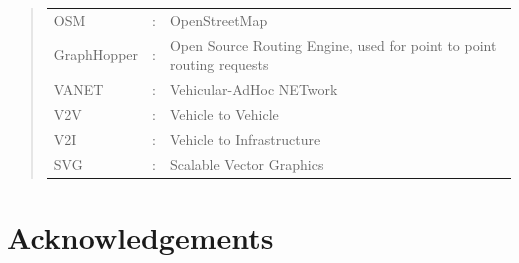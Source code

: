\documentclass[ %
                    author={Alexander Hill},
                supervisor={Dr. Benjamin Sach},
                    degree={MEng},
                     title={MARMOSET},
                  subtitle={Multi-Agent Route Management using Online Simulation for Efficient Transportation},
                      type={research},
                      year={2016} ]{dissertation}
\begin{document}

\begin{quote}
\noindent
\begin{tabular}{lcl}
OSM                 &:     & OpenStreetMap \\
GraphHopper         &:     & Open Source Routing Engine, used for point to point routing requests \\
VANET               &:     & Vehicular-AdHoc NETwork \\
V2V                 &:     & Vehicle to Vehicle \\
V2I                 &:     & Vehicle to Infrastructure \\
SVG                 &:     & Scalable Vector Graphics \\
\end{tabular}
\end{quote}


\chapter*{Acknowledgements}




%
\end{document}
